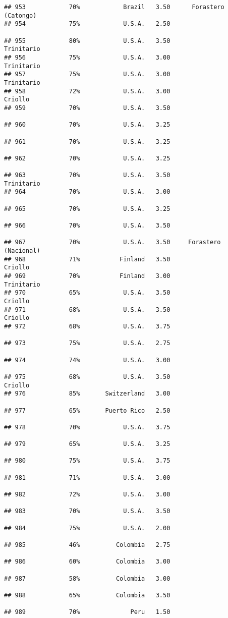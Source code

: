 \documentclass[
]{article}
\begin{document}
\begin{verbatim}
## 953            70%            Brazil   3.50      Forastero (Catongo)
## 954            75%            U.S.A.   2.50                         
## 955            80%            U.S.A.   3.50               Trinitario
## 956            75%            U.S.A.   3.00               Trinitario
## 957            75%            U.S.A.   3.00               Trinitario
## 958            72%            U.S.A.   3.00                  Criollo
## 959            70%            U.S.A.   3.50                         
## 960            70%            U.S.A.   3.25                         
## 961            70%            U.S.A.   3.25                         
## 962            70%            U.S.A.   3.25                         
## 963            70%            U.S.A.   3.50               Trinitario
## 964            70%            U.S.A.   3.00                         
## 965            70%            U.S.A.   3.25                         
## 966            70%            U.S.A.   3.50                         
## 967            70%            U.S.A.   3.50     Forastero (Nacional)
## 968            71%           Finland   3.50                  Criollo
## 969            70%           Finland   3.00               Trinitario
## 970            65%            U.S.A.   3.50                  Criollo
## 971            68%            U.S.A.   3.50                  Criollo
## 972            68%            U.S.A.   3.75                         
## 973            75%            U.S.A.   2.75                         
## 974            74%            U.S.A.   3.00                         
## 975            68%            U.S.A.   3.50                  Criollo
## 976            85%       Switzerland   3.00                         
## 977            65%       Puerto Rico   2.50                         
## 978            70%            U.S.A.   3.75                         
## 979            65%            U.S.A.   3.25                         
## 980            75%            U.S.A.   3.75                         
## 981            71%            U.S.A.   3.00                         
## 982            72%            U.S.A.   3.00                         
## 983            70%            U.S.A.   3.50                         
## 984            75%            U.S.A.   2.00                         
## 985            46%          Colombia   2.75                         
## 986            60%          Colombia   3.00                         
## 987            58%          Colombia   3.00                         
## 988            65%          Colombia   3.50                         
## 989            70%              Peru   1.50                         

\end{verbatim}
\end{document}
